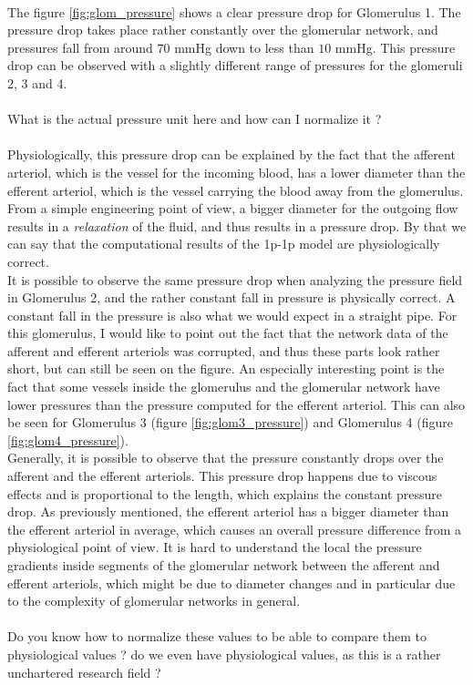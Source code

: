 \\The figure \ref{fig:glom_pressure} shows a clear pressure drop for Glomerulus 1. The pressure drop takes place rather constantly over the glomerular network, and pressures fall from around $70$ mmHg down to less than $10$ mmHg. This pressure drop can be observed with a slightly different range of pressures for the glomeruli 2, 3 and 4.\\
\\{\color{red} What is the actual pressure unit here and how can I normalize it ?}
\\
\\Physiologically, this pressure drop can be explained by the fact that the afferent arteriol, which is the vessel for the incoming blood, has a lower diameter than the efferent arteriol, which is the vessel carrying the blood away from the glomerulus. From a simple engineering point of view, a bigger diameter for the outgoing flow results in a \emph{relaxation} of the fluid, and thus results in a pressure drop. By that we can say that the computational results of the 1p-1p model are physiologically correct.
\\It is possible to observe the same pressure drop when analyzing the pressure field in Glomerulus 2, and the rather constant fall in pressure is physically correct. A constant fall in the pressure is also what we would expect in a straight pipe. For this glomerulus, I would like to point out the fact that the network data of the afferent and efferent arteriols was corrupted, and thus these parts look rather short, but can still be seen on the figure. An especially interesting point is the fact that some vessels inside the glomerulus and the glomerular network have lower pressures than the pressure computed for the efferent arteriol. This can also be seen for Glomerulus 3 (figure \ref{fig:glom3_pressure}) and Glomerulus 4 (figure \ref{fig:glom4_pressure}).
\\Generally, it is possible to observe that the pressure constantly drops over the afferent and the efferent arteriols. This pressure drop happens due to viscous effects and is proportional to the length, which explains the constant pressure drop. As previously mentioned, the efferent arteriol has a bigger diameter than the efferent arteriol in average, which causes an overall pressure difference from a physiological point of view. It is hard to understand the local the pressure gradients inside segments of the glomerular network between the afferent and efferent arteriols, which might be due to diameter changes and in particular due to the complexity of glomerular networks in general.
\\
\\{\color{red} Do you know how to normalize these values to be able to compare them to physiological values ? do we even have physiological values, as this is a rather unchartered research field ?}

